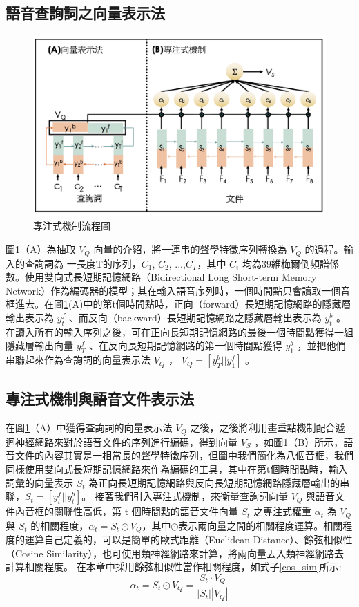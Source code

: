 \subsection{語音查詢詞之向量表示法}
\label{ch4_qv}
\begin{figure}[h]
\centering
\includegraphics[scale=0.7]{images/ch4_att.png} 
\caption{專注式機制流程圖}
\label{ch4_att}
\end{figure}
\label{ch4_query_vec}
圖\ref{ch4_att}（A）為抽取 $V_Q$ 向量的介紹，將一連串的聲學特徵序列轉換為
$V_Q$ 的過程。輸入的查詢詞為
一長度T的序列，$C_1$, $C_2$,
...,$C_T$，其中 $C_i$ 均為39維梅爾倒頻譜係數。使用雙向式長短期記憶網路（Bidirectional
Long Short-term Memory
Network）作為編碼器的模型；其在輸入語音序列時，一個時間點只會讀取一個音框進去。在圖\ref{ch4_att}(A)中的第t個時間點時，正向（forward）長短期記憶網路的隱藏層輸出表示為
$y_t^f$ 、而反向（backward）長短期記憶網路之隱藏層輸出表示為 $y_{t}^b$
。在讀入所有的輸入序列之後，可在正向長短期記憶網路的最後一個時間點獲得一組隱藏層輸出向量
$y_{T}^f$ 、在反向長短期記憶網路的第一個時間點獲得 $y_{1}^b$
，並把他們串聯起來作為查詢詞的向量表示法 $V_Q$ ， $V_Q
= [y_T^b || y_1^f]$ 。

\subsection{專注式機制與語音文件表示法}
在圖\ref{ch4_att}（A）中獲得查詢詞的向量表示法 $V_Q$
之後，之後將利用畫重點機制配合遞迴神經網路來對於語音文件的序列進行編碼，得到向量
$V_S$
，如圖\ref{ch4_att}（B）所示，語音文件的內容其實是一相當長的聲學特徵序列，但圖中我們簡化為八個音框，我們同樣使用雙向式長短期記憶網路來作為編碼的工具，其中在第t個時間點時，輸入詞彙的向量表示
$S_t$ 為正向長短期記憶網路與反向長短期記憶網路隱藏層輸出的串聯，$S_t
= [ y_t^f || y_t^b ]$。
接著我們引入專注式機制，來衡量查詢詞向量 $V_Q$
與語音文件內音框的關聯性高低，第 t 個時間點的語音文件向量 $S_t$
之專注式權重 $\alpha_t$ 為 $V_Q$ 與 $S_t$ 的相關程度，$\alpha_t=
S_t \odot
V_Q$，其中$\odot$表示兩向量之間的相關程度運算。相關程度的運算自己定義的，可以是簡單的歐式距離（Euclidean
Distance）、餘弦相似性（Cosine Similarity），也可使用類神經網路來計算，將兩向量丟入類神經網路去計算相關程度。
在本章中採用餘弦相似性當作相關程度，如式子\ref{cos_sim}所示:
\begin{equation}
	\label{cos_sim}
	\alpha_t = S_t \odot V_Q = \frac{S_t \cdot V_Q}{|S_t||V_Q|}
\end{equation}

